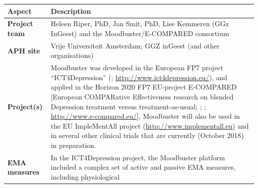 \documentclass[]{book}
\begin{document}
\begin{longtable}[]{@{}ll@{}}
\toprule
\begin{minipage}[b]{0.25\columnwidth}\raggedright\strut
\textbf{Aspect}\strut
\end{minipage} & \begin{minipage}[b]{0.69\columnwidth}\raggedright\strut
\textbf{Description}\strut
\end{minipage}\tabularnewline
\midrule
\endhead
\begin{minipage}[t]{0.25\columnwidth}\raggedright\strut
\textbf{Project team}\strut
\end{minipage} & \begin{minipage}[t]{0.69\columnwidth}\raggedright\strut
Heleen Riper, PhD, Jan Smit, PhD, Lise Kemmeren (GGz InGeest) and the
Moodbuster/E-COMPARED consortium\strut
\end{minipage}\tabularnewline
\begin{minipage}[t]{0.25\columnwidth}\raggedright\strut
\textbf{APH site}\strut
\end{minipage} & \begin{minipage}[t]{0.69\columnwidth}\raggedright\strut
Vrije Universiteit Amsterdam; GGZ inGeest (and other
organisations)\strut
\end{minipage}\tabularnewline
\begin{minipage}[t]{0.25\columnwidth}\raggedright\strut
\textbf{Project(s)}\strut
\end{minipage} & \begin{minipage}[t]{0.69\columnwidth}\raggedright\strut
Moodbuster was developed in the European FP7 project ``ICT4Depression''
(\citet{warmerdam2012}; \url{http://www.ict4depression.eu/}), and
applied in the Horizon 2020 FP7 EU-project E-COMPARED {[}European
COMPARative Effectiveness research on blended Depression treatment
versus treatment-as-usual; \citet{Kleiboer2016}; \citet{kemmeren2016};
\url{http://www.e-compared.eu/}{]}, Moodbuster will also be used in the
EU ImpleMentAll project (\url{http://www.implementall.eu}) and in
several other clinical trials that are currently (October 2018) in
preparation.\strut
\end{minipage}\tabularnewline
\begin{minipage}[t]{0.25\columnwidth}\raggedright\strut
\textbf{EMA measures}\strut
\end{minipage} & \begin{minipage}[t]{0.69\columnwidth}\raggedright\strut
In the ICT4Depression project, the Moodbuster platform included a
complex set of active and passive EMA measures, including physiological

\end{minipage}
\end{longtable}
\end{document}
